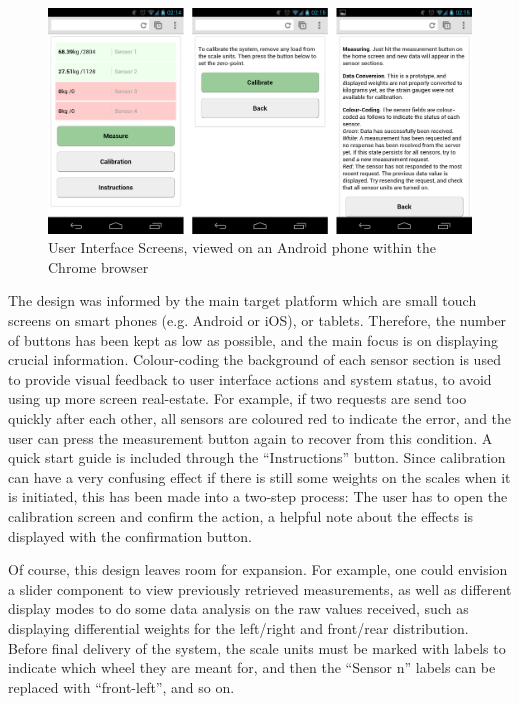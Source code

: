 \begin{figure}
\includegraphics[width=\textwidth]{images/screenshots/ui-screenshot.png}
\caption{User Interface Screens, viewed on an Android phone within the Chrome browser}
\label{ui-screenshot}
\end{figure}

The design was informed by the main target platform which are small touch screens on smart phones (e.g. Android or iOS), or tablets. Therefore, the number of buttons has been kept as low as possible, and the main focus is on displaying crucial information. Colour-coding the background of each sensor section is used to provide visual feedback to user interface actions and system status, to avoid using up more screen real-estate. For example, if two requests are send too quickly after each other, all sensors are coloured red to indicate the error, and the user can press the measurement button again to recover from this condition. A quick start guide is included through the ``Instructions'' button. Since calibration can have a very confusing effect if there is still some weights on the scales when it is initiated, this has been made into a two-step process: The user has to open the calibration screen and confirm the action, a helpful note about the effects is displayed with the confirmation button.

Of course, this design leaves room for expansion. For example, one could envision a slider component to view previously retrieved measurements, as well as different display modes to do some data analysis on the raw values received, such as displaying differential weights for the left/right and front/rear distribution. Before final delivery of the system, the scale units must be marked with labels to indicate which wheel they are meant for, and then the ``Sensor n'' labels can be replaced with ``front-left'', and so on.

